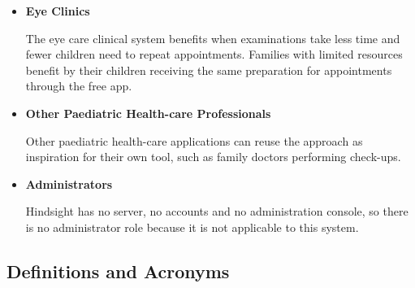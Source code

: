 \documentclass[12pt]{article}
\begin{document}
\begin{itemize}
\item \textbf{Eye Clinics} 

The eye care clinical system benefits when examinations take less time and fewer children need 
to repeat appointments. Families with limited resources benefit by their children receiving the same preparation 
for appointments through the free app. 

\item \textbf{Other Paediatric Health-care Professionals} 

Other paediatric health-care applications can reuse the approach as inspiration for their own tool, 
such as family doctors performing check-ups.

\item \textbf{Administrators} 

Hindsight has no server, no accounts and no administration console, so there is no administrator role
because it is not applicable to this system.
\end{itemize}

\subsection{Definitions and Acronyms} \label{sec_DefinitionsAndAcronyms}

\renewcommand{\arraystretch}{1.3}
\end{document}
